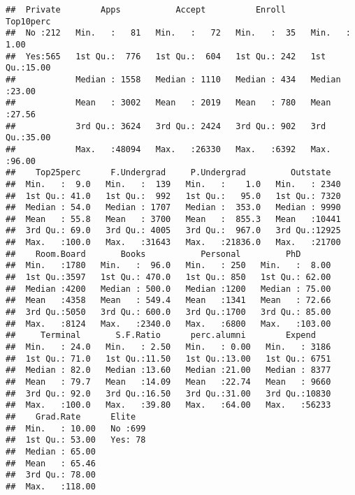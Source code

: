 \documentclass[]{article}
\newenvironment{Shaded}{\begin{snugshade}}{\end{snugshade}}
\newcommand{\CommentTok}[1]{\textcolor[rgb]{0.56,0.35,0.01}{\textit{#1}}}
\newcommand{\DataTypeTok}[1]{\textcolor[rgb]{0.13,0.29,0.53}{#1}}
\newcommand{\KeywordTok}[1]{\textcolor[rgb]{0.13,0.29,0.53}{\textbf{#1}}}
\newcommand{\NormalTok}[1]{#1}
\newcommand{\OperatorTok}[1]{\textcolor[rgb]{0.81,0.36,0.00}{\textbf{#1}}}
\newcommand{\StringTok}[1]{\textcolor[rgb]{0.31,0.60,0.02}{#1}}
\begin{document}
\begin{verbatim}
##  Private        Apps           Accept          Enroll       Top10perc    
##  No :212   Min.   :   81   Min.   :   72   Min.   :  35   Min.   : 1.00  
##  Yes:565   1st Qu.:  776   1st Qu.:  604   1st Qu.: 242   1st Qu.:15.00  
##            Median : 1558   Median : 1110   Median : 434   Median :23.00  
##            Mean   : 3002   Mean   : 2019   Mean   : 780   Mean   :27.56  
##            3rd Qu.: 3624   3rd Qu.: 2424   3rd Qu.: 902   3rd Qu.:35.00  
##            Max.   :48094   Max.   :26330   Max.   :6392   Max.   :96.00  
##    Top25perc      F.Undergrad     P.Undergrad         Outstate    
##  Min.   :  9.0   Min.   :  139   Min.   :    1.0   Min.   : 2340  
##  1st Qu.: 41.0   1st Qu.:  992   1st Qu.:   95.0   1st Qu.: 7320  
##  Median : 54.0   Median : 1707   Median :  353.0   Median : 9990  
##  Mean   : 55.8   Mean   : 3700   Mean   :  855.3   Mean   :10441  
##  3rd Qu.: 69.0   3rd Qu.: 4005   3rd Qu.:  967.0   3rd Qu.:12925  
##  Max.   :100.0   Max.   :31643   Max.   :21836.0   Max.   :21700  
##    Room.Board       Books           Personal         PhD        
##  Min.   :1780   Min.   :  96.0   Min.   : 250   Min.   :  8.00  
##  1st Qu.:3597   1st Qu.: 470.0   1st Qu.: 850   1st Qu.: 62.00  
##  Median :4200   Median : 500.0   Median :1200   Median : 75.00  
##  Mean   :4358   Mean   : 549.4   Mean   :1341   Mean   : 72.66  
##  3rd Qu.:5050   3rd Qu.: 600.0   3rd Qu.:1700   3rd Qu.: 85.00  
##  Max.   :8124   Max.   :2340.0   Max.   :6800   Max.   :103.00  
##     Terminal       S.F.Ratio      perc.alumni        Expend     
##  Min.   : 24.0   Min.   : 2.50   Min.   : 0.00   Min.   : 3186  
##  1st Qu.: 71.0   1st Qu.:11.50   1st Qu.:13.00   1st Qu.: 6751  
##  Median : 82.0   Median :13.60   Median :21.00   Median : 8377  
##  Mean   : 79.7   Mean   :14.09   Mean   :22.74   Mean   : 9660  
##  3rd Qu.: 92.0   3rd Qu.:16.50   3rd Qu.:31.00   3rd Qu.:10830  
##  Max.   :100.0   Max.   :39.80   Max.   :64.00   Max.   :56233  
##    Grad.Rate      Elite    
##  Min.   : 10.00   No :699  
##  1st Qu.: 53.00   Yes: 78  
##  Median : 65.00            
##  Mean   : 65.46            
##  3rd Qu.: 78.00            
##  Max.   :118.00
\end{verbatim}

\begin{Shaded}
\end{Shaded}
\end{document}
